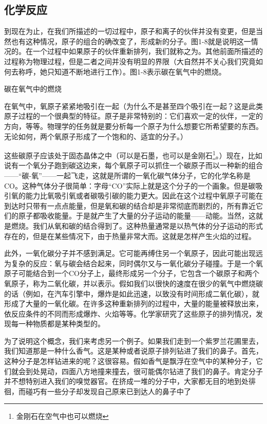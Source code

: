 \documentclass[11pt,oneside]{book}
\begin{document}
\begin{common-format}
\section{化学反应}
到现在为止，在我们所描述的一切过程中，原子和离子的伙伴并没有变更，但是当然也有这种情况，原子的组合的确改变了，形成新的分子。图1-8就是说明这一情况的。在一个过程中如果原子的伙伴重新排列，我们就称之为。其他前面所描述的过程称为物理过程，但是二者之间并没有明显的界限（大自然并不关心我们究竟如何去称呼，她只知道不断地进行工作）。图1-8表示碳在氧气中的燃烧。
\begin{fig}{碳在氧气中的燃烧}
\label{fig:碳在氧气中的燃烧}
\end{fig}
在氧气中，氧原子紧紧地吸引在一起（为什么不是甚至四个吸引在一起？这是此类原子过程的一个很典型的特征。原子是非常特别的：它们喜欢一定的伙伴，一定的方向，等等。物理学的任务就是要分析每一个原子为什么想要它所希望要的东西。无论如何，两个氧原子形成了一个饱和的、适宜的分子。）

这些碳原子应该处于固态晶体之中（可以是石墨，也可以是金刚石\footnote{金刚石在空气中也可以燃烧}。）现在，比如说有一个氧分子跑到碳这边来，每个氧原子可以抓住一个碳原子而以一种新的组合——“碳-氧”——一起飞走，这就是所谓的一氧化碳气体分子，它的化学名称是CO。这种气体分子很简单：字母“CO”实际上就是这个分子的一个画象。但是碳吸引氧的能力比氧吸引氧或者碳吸引碳的能力更大。因此在这个过程中氧原子可能在到达时只带有一点点能量，但是氧和碳的结合却是非常彻底而剧烈的，所有靠近它们的原子都吸收能量。于是就产生了大量的分子运动的能量——动能。当然，这就是燃烧。我们从氧和碳的结合得到了。这种热量通常是以热气体的分子运动的形式存在的，但是在某些情况下，由于热量非常大而。这就是怎样产生火焰的过程。

此外，一氧化碳分子并不感到满足。它可能再缚住另一个氧原子，因此可能出现远为复杂的反应：氧与碳会结合起来，同时偶尔又与一氧化碳分子碰撞。于是一个氧原子可能结合到一个CO分子上，最终形成另一个分子，它包含一个碳原子和两个氧原子，称为二氧化碳，并以表示。假如我们以很快的速度在很少的氧气中燃烧碳的话（例如，在汽车引擎中，爆炸是如此迅速，以致没有时间形成二氧化碳），就形成了大量的一氧化碳。在许多这种重新排列的过程中，大量的能量被释放出来，依反应条件的不同而形成爆炸、火焰等等。化学家研究了这些原子的排列情况，发现每一种物质都是某种类型的。

为了说明这个概念，我们来考虑另一个例子。如果我们走到一个紫罗兰花圃里去，我们知道那是一种什么香气。这是某种或者说原子排列钻进了我们的鼻子。首先，这种分子是怎样钻进来的呢？这很容易。假如香气是飘浮在空气中的某种分子，它们就会到处晃动，四面八方地撞来撞去，很可能偶尔钻进了我们的鼻子。肯定分子并不想特别进入我们的嗅觉器官。在挤成一堆的分子中，大家都无目的地到处徘徊，而碰巧有一些分子却发现自己原来已到达人的鼻子中了


\end{common-format}
\end{document}
